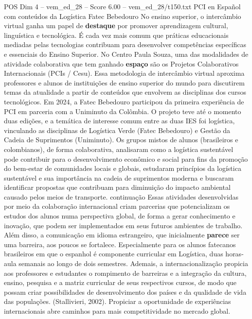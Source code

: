 \begin{textsample}{POS Dim 4 – vem\_ed\_28 – Score 6.00 – vem\_ed\_28/t150.txt}  \label{ex:f4_pos_041}
PCI en Español com conteúdos da Logística Fatec Bebedouro No ensino superior, o intercâmbio virtual ganha um papel de \textbf{destaque} por promover aprendizagem cultural, linguística e tecnológica.
É cada vez mais comum que práticas educacionais mediadas pelas tecnologias contribuam para desenvolver competências específicas e essenciais do Ensino Superior.
No Centro Paula Souza, uma das modalidades de atividade colaborativa que tem ganhado \textbf{espaço} são os Projetos Colaborativos Internacionais (PCIs / Cesu).
Essa metodologia de intercâmbio virtual aproxima professores e alunos de instituições de ensino superior do mundo para discutirem temas da atualidade a partir de conteúdos que envolvem as disciplinas dos cursos tecnológicos.
Em 2024, a Fatec Bebedouro participou da primeira experiência de PCI em parceria com a Uniminuto da Colômbia.
O projeto teve até o momento duas edições, e a temática de interesse comum entre as duas IES foi logística, vinculando as disciplinas de Logística Verde (Fatec Bebedouro) e Gestão da Cadeia de Suprimentos (Uniminuto).
Os grupos mistos de alunos (brasileiros e colombianos), de forma colaborativa, analisaram como a logística sustentável pode contribuir para o desenvolvimento econômico e social para fins da promoção do bem-estar de comunidades locais e globais, estudaram princípios da logística sustentável e sua importância na cadeia de suprimentos moderna e buscaram identificar propostas que contribuam para diminuição do impacto ambiental causado pelos meios de transporte. continuação Essas atividades desenvolvidas por meio da colaboração internacional criam parcerias que potencializam os estudos dos alunos numa perspectiva global, de forma a gerar conhecimento e inovação, que podem ser implementados em seus futuros ambientes de trabalho.
Além disso, a comunicação em idioma estrangeiro, que inicialmente \textbf{parece} ser uma barreira, aos poucos se fortalece.
Especialmente para os alunos fatecanos brasileiros em que o espanhol é componente curricular em Logística, duas horas-aula semanais ao longo de dois semestres.
Ademais, a internacionalização propicia aos professores e estudantes o rompimento de barreiras e a integração da cultura, ensino, pesquisa e a matriz curricular de seus respectivos cursos, de modo que possam criar possibilidades de desenvolvimento dos países e da qualidade de vida das populações. (Stallivieri, 2002).
Propiciar a oportunidade de experiências internacionais abre caminhos para mais competitividade no mercado global.

\end{textsample}
